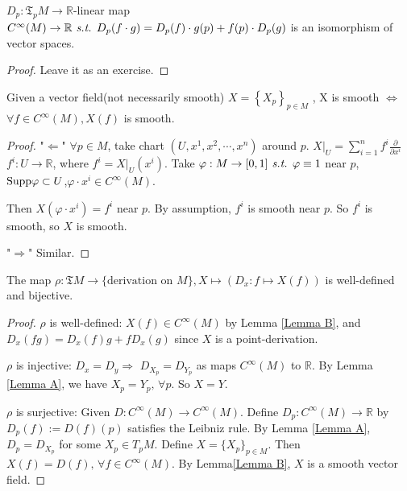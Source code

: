 
\begin{lemma}\label{Lemma A}
    $D_p:\mathfrak{T}_p{M} \rightarrow \mathbb{R}$-linear map $C^\infty(M)\rightarrow\mathbb{R} \textit{ s.t. } D_p(f\cdot g)=D_p(f)\cdot g(p)+f(p)\cdot D_p(g)$ is an isomorphism of vector spaces.
\end{lemma}
\begin{proof}

     Leave it as an exercise.
\end{proof}
\begin{lemma}\label{Lemma B}
    Given a vector field(not necessarily smooth) $X=\left\{X_p\right\}_{p\in M}$ , X is smooth $\Leftrightarrow$ $\forall f \in C^\infty(M),X(f)$ is smooth.
\end{lemma}
\begin{proof}
    "$ \Leftarrow $" $\forall p\in M$, take chart $(U,x^1,x^2,\cdots,x^n)$ around $p$. $X|_U=\sum_{i=1}^{n}{f^i\frac{\partial}{\partial x^i}}$  $f^i:U\rightarrow \mathbb{R}$, where $f^i=X|_U(x^i)$.
    Take $\varphi:M\rightarrow [0,1] \textit{ s.t. } \varphi \equiv 1 $ near $p$, $\mathrm{Supp} \varphi\subset U$,$\varphi \cdot x^i\in C^\infty(M)$.
    
    Then $X(\varphi \cdot x^i)=f^i$ near $p$. By assumption, $f^i$ is smooth near $p$. So $f^i$ is smooth, so $X$ is smooth.
    
     "$ \Rightarrow $" Similar.
\end{proof}
\begin{theorem}
    The map $\rho:\mathfrak{T}M\rightarrow \{\text{derivation on }M\},X\mapsto (D_x:f\mapsto X(f))$ is well-defined and bijective.
\end{theorem}
\begin{proof}
     $ \rho $ is well-defined: $ X(f)\in C^\infty(M) $ by Lemma \ref{Lemma B}, and  $ D_x(fg)=D_x(f)g+fD_x(g) $ since  $ X $ is a point-derivation.
     
      $ \rho $ is injective: $ D_x=D_y\Rightarrow $ $ D_{X_p}=D_{Y_p} $ as maps  $ C^\infty(M) $ to  $ \mathbb{R} $. By Lemma \ref{Lemma A}, we have  $ X_p=Y_p,\,\forall p $. So  $ X=Y $.  
      
       $ \rho $ is surjective: Given  $ D:C^\infty(M)\rightarrow C^\infty(M) $. Define  $ D_p:C^\infty(M)\rightarrow \mathbb{R} $ by  $ D_p(f):=D(f)(p) $ satisfies the Leibniz rule. By Lemma \ref{Lemma A},  $ D_p=D_{X_p} $ for some  $ X_p\in T_pM $. Define  $ X=\{X_p\}_{p\in M} $. Then  $ X(f)=D(f) ,\,\forall f\in C^\infty(M)$. By Lemma\ref{Lemma B},  $ X $ is a smooth vector field.    
\end{proof}
